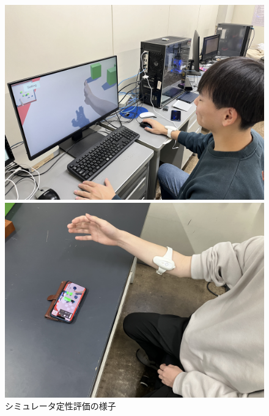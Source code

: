 \documentclass{ltjsreport}
\begin{document}
		\begin{figure}[H]
		\centering
		\begin{minipage}{0.4\columnwidth}
		\centering
		\includegraphics[width = \columnwidth]{../figs/IMG_5132.JPG}
		\end{minipage}
		\hspace{0.04\columnwidth}
		\begin{minipage}{0.4\columnwidth}
		\centering
		\includegraphics[width = \columnwidth]{../figs/IMG_6323.jpg}
		\end{minipage}
		\caption{シミュレータ定性評価の様子}
		\label{fig:simuraterimage}
		\end{figure}
		\vspace{-15pt}
\end{document}
